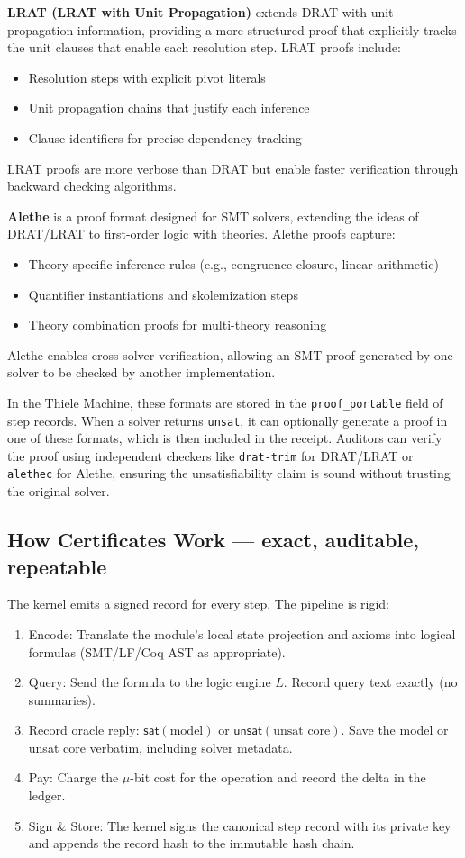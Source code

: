 \documentclass[11pt]{article}
\begin{document}
\textbf{LRAT (LRAT with Unit Propagation)} extends DRAT with unit propagation information, providing a more structured proof that explicitly tracks the unit clauses that enable each resolution step. LRAT proofs include:
\begin{itemize}
  \item Resolution steps with explicit pivot literals
  \item Unit propagation chains that justify each inference
  \item Clause identifiers for precise dependency tracking
\end{itemize}
LRAT proofs are more verbose than DRAT but enable faster verification through backward checking algorithms.

\textbf{Alethe} is a proof format designed for SMT solvers, extending the ideas of DRAT/LRAT to first-order logic with theories. Alethe proofs capture:
\begin{itemize}
  \item Theory-specific inference rules (e.g., congruence closure, linear arithmetic)
  \item Quantifier instantiations and skolemization steps
  \item Theory combination proofs for multi-theory reasoning
\end{itemize}
Alethe enables cross-solver verification, allowing an SMT proof generated by one solver to be checked by another implementation.

In the Thiele Machine, these formats are stored in the \texttt{proof\_portable} field of step records. When a solver returns \texttt{unsat}, it can optionally generate a proof in one of these formats, which is then included in the receipt. Auditors can verify the proof using independent checkers like \texttt{drat-trim} for DRAT/LRAT or \texttt{alethec} for Alethe, ensuring the unsatisfiability claim is sound without trusting the original solver.

\subsection{How Certificates Work — exact, auditable, repeatable}
The kernel emits a signed record for every step. The pipeline is rigid:

\begin{enumerate}
  \item Encode: Translate the module’s local state projection and axioms into logical formulas (SMT/LF/Coq AST as appropriate).
  \item Query: Send the formula to the logic engine $L$. Record query text exactly (no summaries).
  \item Record oracle reply: \(\mathsf{sat}(\text{model})\) or \(\mathsf{unsat}(\text{unsat\_core})\). Save the model or unsat core verbatim, including solver metadata.
  \item Pay: Charge the $\mu$-bit cost for the operation and record the delta in the ledger.
  \item Sign \& Store: The kernel signs the canonical step record with its private key and appends the record hash to the immutable hash chain.
\end{enumerate}
\end{document}
